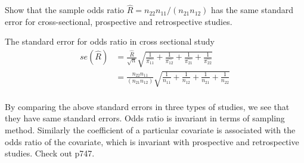 	Show that the sample odds ratio $\hat R = n_{22}n_{11}/(n_{21}n_{12})$ has the same standard error for cross-sectional, prospective and retrospective studies.
	
	
	The standard error for odds ratio in cross sectional study\\
	\begin{align*}
		se(\hat R) &= \frac{\hat{R}}{\sqrt{n}} \sqrt{\frac{1}{\hat{\pi_{11}}} + \frac{1}{\hat{\pi_{12}}} + \frac{1}{\hat{\pi_{21}}} + \frac{1}{\hat{\pi_{22}}}}\\
		&= \frac{{n_{22}n_{11}}}{(n_{21}n_{12})} \sqrt{\frac{1}{n_{11}} + \frac{1}{n_{12}} + \frac{1}{n_{21}} + \frac{1}{n_{22}}}\\
	\end{align*}

	
	By comparing the above standard errors in three types of studies, we see that they have same standard errors. Odds ratio is invariant in terms of sampling method. 
Similarly the coefficient of a particular covariate is associated with the odds ratio of the covariate, which is invariant with prospective and retrospective studies. Check out p747.


